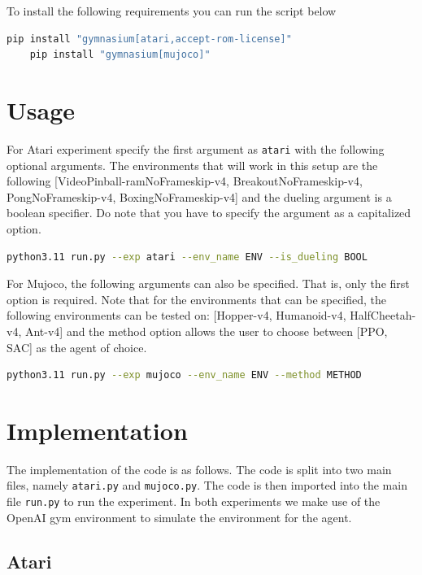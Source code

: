 \documentclass{article}
\newcommand{\code}[1]{\lstinline|#1|}
\begin{document}
To install the following requirements you can run the script below

\begin{lstlisting}[language=bash]
    pip install "gymnasium[atari,accept-rom-license]"
    pip install "gymnasium[mujoco]"
\end{lstlisting}

\section*{Usage}

For Atari experiment specify the first argument as \code{atari} with the
following optional arguments. The environments that will work in this setup are
the following [VideoPinball-ramNoFrameskip-v4, BreakoutNoFrameskip-v4,
        PongNoFrameskip-v4, BoxingNoFrameskip-v4] and the dueling argument is a boolean
specifier. Do note that you have to specify the argument as a capitalized
option.

\begin{lstlisting}[language=bash]
python3.11 run.py --exp atari --env_name ENV --is_dueling BOOL
\end{lstlisting}

For Mujoco, the following arguments can also be specified. That is, only the
first option is required. Note that for the environments that can be specified,
the following environments can be tested on: [Hopper-v4, Humanoid-v4,
HalfCheetah-v4, Ant-v4] and the method option allows the user to choose between
    [PPO, SAC] as the agent of choice.

\begin{lstlisting}[language=bash]
python3.11 run.py --exp mujoco --env_name ENV --method METHOD
\end{lstlisting}

\newpage

\section*{Implementation}

The implementation of the code is as follows. The code is split into two main
files, namely \code{atari.py} and \code{mujoco.py}. The code is then imported
into the main file \code{run.py} to run the experiment. In both experiments we
make use of the OpenAI gym environment to simulate the environment for the
agent.

\subsection*{Atari}
\end{document}
